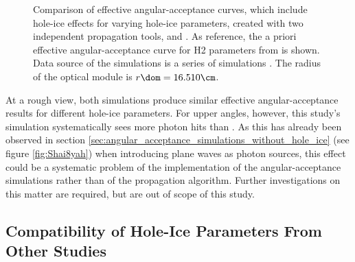 \begin{figure}[htbp]
  \hfill
  \hfill
  \hfill
  \hfill
  \caption{Comparison of effective angular-acceptance curves, which include hole-ice effects for varying hole-ice parameters, created with two independent propagation tools, \ppc and \clsim. As reference, the a priori effective angular-acceptance curve for H2 parameters from \cite{icepaper} is shown. Data source of the \ppc simulations is a series of  simulations \cite{icrc17pocam}. The radius of the optical module is $r\dom = 16.510\cm$.}
  \label{fig:Ou7fux1o}
\end{figure}

At a rough view, both simulations produce similar effective angular-acceptance results for different hole-ice parameters. For upper angles, however, this study's simulation systematically sees more photon hits than \ppc. As this has already been observed in section \ref{sec:angular_acceptance_simulations_without_hole_ice} (see figure \ref{fig:Shai8yah}) when introducing plane waves as photon sources, this effect could be a systematic problem of the implementation of the angular-acceptance simulations rather than of the propagation algorithm.
Further investigations on this matter are required, but are out of scope of this study.\followup


\subsection{Compatibility of Hole-Ice Parameters From Other Studies}
\label{sec:angular_acceptance_comparison}\label{sec:parameter_comparison}


